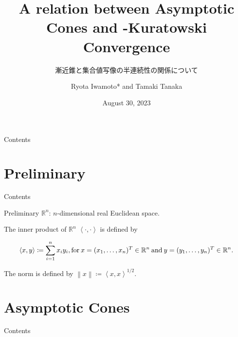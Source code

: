 \documentclass[aspectratio=169, dvipdfmx, 11pt]{beamer} %
\title[continuous properties of asymptotic cone ]{A relation between Asymptotic Cones and \Painleve-Kuratowski Convergence}
\subtitle{漸近錐と集合値写像の半連続性の関係について}
\author[Ryota Iwamoto]{Ryota Iwamoto* and Tamaki Tanaka}
\institute[Niigata Univ]{Niigata Univ}
\date{August 30, 2023}
\newcommand{\NDemenstionalRealEuclidianSpace}{\mathbb{R}^n}
\begin{document}
\maketitle

\begin{frame}{Contents}
  \tableofcontents
\end{frame}

\section{Preliminary}
\begin{frame}{Contents}
  \tableofcontents[currentsection]
\end{frame}

\begin{frame}{Preliminary}
$\NDemenstionalRealEuclidianSpace$: $n$-dimensional real Euclidean space.

The inner product of $\NDemenstionalRealEuclidianSpace$ $\left\langle \cdot ,\cdot \right\rangle$  is defined by

\begin{equation}
  \left\langle x,y\right\rangle \coloneqq \sum_{i = 1}^{n} x_i y_i, \text{for}\: x=(x_1,\dots,x_n)^T \in \mathbb{R}^n \:\text{and}\: y=(y_1,\dots,y_n)^T \in \mathbb{R}^n. \notag
\end{equation}

The norm is defined by $\left\lVert x \right\rVert \coloneqq \left\langle x,x\right\rangle ^{1/2} $.

\end{frame}

\section{Asymptotic Cones}
\begin{frame}{Contents}
  \tableofcontents[currentsection]
\end{frame}
\end{document}

